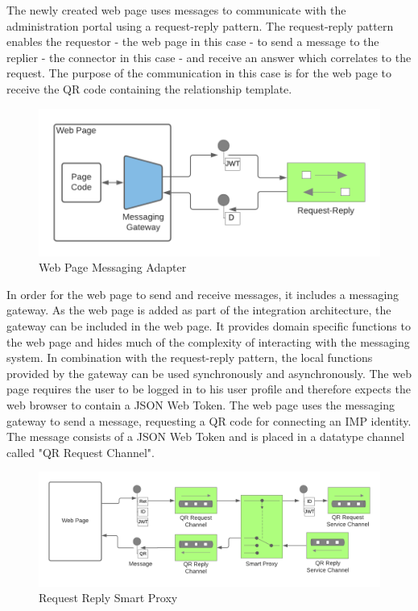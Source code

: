 \documentclass[
     12pt,         %
     a4paper,      %
     BCOR=10mm,version=first,     %
     DIV=14,version=first,        %
     ]{scrreprt}
\begin{document}
The newly created web page uses messages to communicate with the administration portal using a request-reply pattern. The request-reply pattern enables the requestor - the web page in this case - to send a message to the replier - the connector in this case - and receive an answer which correlates to the request. The purpose of the communication in this case is for the web page to receive the QR code containing the relationship template.

\begin{figure}[h]
\caption{Web Page Messaging Adapter}
    \centering
    \includegraphics[scale=0.3]{Diagrams/Integration 1/Connection/Messaging 1.png}
\end{figure}

In order for the web page to send and receive messages, it includes a messaging gateway. As the web page is added as part of the integration architecture, the gateway can be included in the web page. It provides domain specific functions to the web page and hides much of the complexity of interacting with the messaging system. In combination with the request-reply pattern, the local functions provided by the gateway can be used synchronously and asynchronously.
The web page requires the user to be logged in to his user profile and therefore expects the web browser to contain a JSON Web Token. The web page uses the messaging gateway to send a message, requesting a QR code for connecting an IMP identity. The message consists of a JSON Web Token and is placed in a datatype channel called "QR Request Channel". 

\begin{figure}[h]
\caption{Request Reply Smart Proxy}
    \centering
    \includegraphics[scale=0.3]{Diagrams/Integration 1/Connection/Messaging 2.png}
\end{figure}
\end{document}
